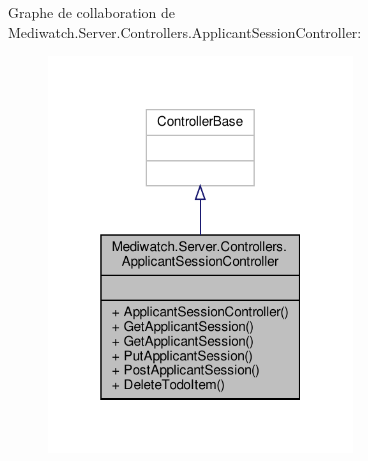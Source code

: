 Graphe de collaboration de Mediwatch.\+Server.\+Controllers.\+Applicant\+Session\+Controller\+:\nopagebreak
\begin{figure}[H]
\begin{center}
\leavevmode
\includegraphics[width=229pt]{class_mediwatch_1_1_server_1_1_controllers_1_1_applicant_session_controller__coll__graph}
\end{center}
\end{figure}
